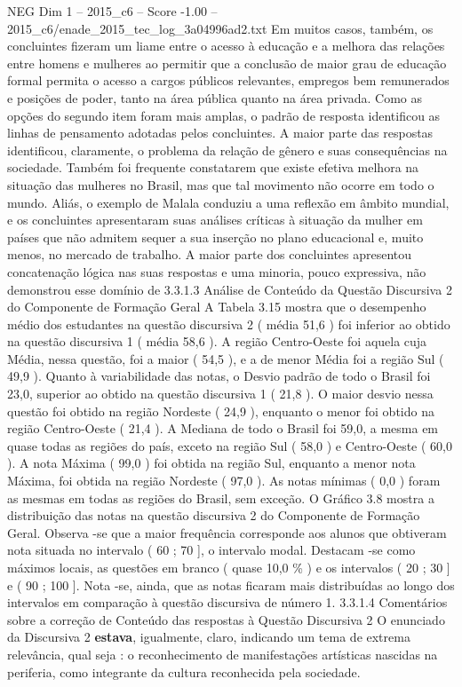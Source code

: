 \begin{textsample}{NEG Dim 1 – 2015\_c6 – Score -1.00 – 2015\_c6/enade\_2015\_tec\_log\_3a04996ad2.txt}
Em muitos casos, também, os concluintes fizeram um liame entre o acesso à educação e a melhora das relações entre homens e mulheres ao permitir que a conclusão de maior grau de educação formal permita o acesso a cargos públicos relevantes, empregos bem remunerados e posições de poder, tanto na área pública quanto na área privada.
Como as opções do segundo item foram mais amplas, o padrão de resposta identificou as linhas de pensamento adotadas pelos concluintes.
A maior parte das respostas identificou, claramente, o problema da relação de gênero e suas consequências na sociedade.
Também foi frequente constatarem que existe efetiva melhora na situação das mulheres no Brasil, mas que tal movimento não ocorre em todo o mundo.
Aliás, o exemplo de Malala conduziu a uma reflexão em âmbito mundial, e os concluintes apresentaram suas análises críticas à situação da mulher em países que não admitem sequer a sua inserção no plano educacional e, muito menos, no mercado de trabalho.
A maior parte dos concluintes apresentou concatenação lógica nas suas respostas e uma minoria, pouco expressiva, não demonstrou esse domínio de 3.3.1.3 Análise de Conteúdo da Questão Discursiva 2 do Componente de Formação Geral A Tabela 3.15 mostra que o desempenho médio dos estudantes na questão discursiva 2 ( média 51,6 ) foi inferior ao obtido na questão discursiva 1 ( média 58,6 ).
A região Centro-Oeste foi aquela cuja Média, nessa questão, foi a maior ( 54,5 ), e a de menor Média foi a região Sul ( 49,9 ).
Quanto à variabilidade das notas, o Desvio padrão de todo o Brasil foi 23,0, superior ao obtido na questão discursiva 1 ( 21,8 ).
O maior desvio nessa questão foi obtido na região Nordeste ( 24,9 ), enquanto o menor foi obtido na região Centro-Oeste ( 21,4 ).
A Mediana de todo o Brasil foi 59,0, a mesma em quase todas as regiões do país, exceto na região Sul ( 58,0 ) e Centro-Oeste ( 60,0 ).
A nota Máxima ( 99,0 ) foi obtida na região Sul, enquanto a menor nota Máxima, foi obtida na região Nordeste ( 97,0 ).
As notas mínimas ( 0,0 ) foram as mesmas em todas as regiões do Brasil, sem exceção.
O Gráfico 3.8 mostra a distribuição das notas na questão discursiva 2 do Componente de Formação Geral.
Observa -se que a maior frequência corresponde aos alunos que obtiveram nota situada no intervalo ( 60 ; 70 ], o intervalo modal.
Destacam -se como máximos locais, as questões em branco ( quase 10,0 \% ) e os intervalos ( 20 ; 30 ] e ( 90 ; 100 ].
Nota -se, ainda, que as notas ficaram mais distribuídas ao longo dos intervalos em comparação à questão discursiva de número 1. 3.3.1.4 Comentários sobre a correção de Conteúdo das respostas à Questão Discursiva 2 O enunciado da Discursiva 2 \textbf{estava}, igualmente, claro, indicando um tema de extrema relevância, qual seja : o reconhecimento de manifestações artísticas nascidas na periferia, como integrante da cultura reconhecida pela sociedade.

\end{textsample}
